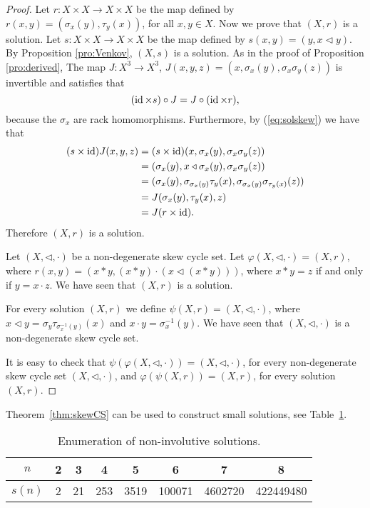 \begin{proof}
Let $r\colon X\times X\to X\times X$ be the map defined by $r(x,y)=(\sigma_x(y),\tau_y(x))$, for all $x,y\in X$. 
Now we prove that $(X,r)$ is a solution. Let $s\colon X\times X\to X\times X$ be the map defined by $s(x,y)=(y,x\triangleleft y)$. By Proposition \ref{pro:Venkov}, $(X,s)$ is a solution. As in the proof of Proposition \ref{pro:derived}, The map $J\colon X^3\to X^3$, $J(x,y,z)=(x,\sigma_x(y),\sigma_x\sigma_y(z))$ is invertible and satisfies that 
$$(\operatorname{id}\times s)\circ J=J\circ (\operatorname{id}\times r),$$
because the $\sigma_x$ are rack homomorphisms. Furthermore, by (\ref{eq:solskew}) we have that
\begin{align*}
	(s\times \operatorname{id})J(x,y,z)&=(s\times \operatorname{id})(x,\sigma_x(y),\sigma_x\sigma_y(z))\\
	&=(\sigma_x(y),x\triangleleft \sigma_x(y),\sigma_x\sigma_y(z))\\
	&=(\sigma_x(y), \sigma_{\sigma_x(y)}\tau_y(x),\sigma_{\sigma_x(y)}\sigma_{\tau_y(x)}(z))\\
	&=J(\sigma_x(y),\tau_y(x),z)\\
	&=J(r\times \operatorname{id}).
\end{align*}
Therefore $(X,r)$ is a solution.

Let $(X,\triangleleft,\cdot)$ be a non-degenerate skew cycle set. Let $\varphi(X,\triangleleft,\cdot)=(X,r)$, where
$r(x,y)=(x*y,(x*y)\cdot(x\triangleleft (x*y)))$, where $x*y=z$ if and only if $y=x\cdot z$. We have seen that $(X,r)$ is a solution.

For every solution $(X,r)$ we define $\psi(X,r)=(X,\triangleleft,\cdot)$, where $x\triangleleft y=\sigma_y\tau_{\sigma_x^{-1}(y)}(x)$ and $x\cdot y=\sigma_x^{-1}(y)$. We have seen that $(X,\triangleleft,\cdot)$ is a non-degenerate skew cycle set.

It is easy to check that $\psi(\varphi(X,\triangleleft,\cdot))=(X,\triangleleft,\cdot)$, for every non-degenerate skew cycle set $(X,\triangleleft,\cdot)$, and $\varphi(\psi(X,r))=(X,r)$, for every solution $(X,r)$.
\end{proof}

Theorem~\ref{thm:skewCS} can be used to construct small solutions, see Table~\ref{tab:non_involutive}.

\begin{table}[H]
\centering
\caption{Enumeration of non-involutive solutions.}
\begin{tabular}{|c|ccccccc|}
\hline
$n$ & 2 & 3 & 4 & 5 & 6 & 7 & 8\tabularnewline
\hline
$s(n)$ & 2 & 21 & 253 & 3519 & 100071 & 4602720 & 422449480\tabularnewline
\hline
\end{tabular}
\label{tab:non_involutive}
\end{table}

